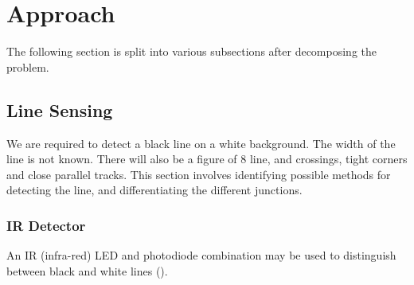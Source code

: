 \documentclass[a4paper]{report}
\begin{document}
\chapter{Approach}
The following section is split into various subsections after decomposing the problem.

\section{Line Sensing}
We are required to detect a black line on a white background. The width of the line is not known. There will also be a figure of 8 line, and crossings, tight corners and close parallel tracks. This section involves identifying possible methods for detecting the line, and differentiating the different junctions.

\subsection{IR Detector}
An IR (infra-red) LED and photodiode combination may be used to distinguish between black and white lines (\cite{adafruit}).

\printbibliography
\end{document}

